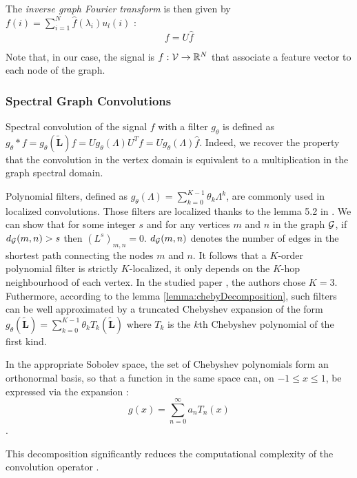 The \textit{inverse graph Fourier transform} is then given by $f(i) = \sum_{i=1}^{N} \hat{f}(\lambda_i)u_l(i)$ : 
\begin{equation}
    f = U\hat{f}
\end{equation}

Note that, in our case, the signal is $f:\mathcal{V}\rightarrow\mathbb{R}^N$ that associate a feature vector to each node of the graph.

\subsubsection{Spectral Graph Convolutions}

Spectral convolution of the signal $f$ with a filter $g_\theta$ is defined as $g_\theta * f = g_\theta(\widetilde{\mathbf{L}})f = Ug_\theta(\Lambda)U^Tf = U g_\theta(\Lambda)\hat{f}$. 
Indeed, we recover the property that the convolution in the vertex domain is equivalent to a multiplication in the graph spectral domain.

Polynomial filters, defined as $g_\theta(\Lambda) = \sum_{k=0}^{K-1}\theta_k\Lambda^k$, are commonly used in localized convolutions. Those filters are localized thanks to the lemma 5.2 in \cite{hammond_wavelets_2011}. We can show that for some integer $s$ and for any 
vertices $m$ and $n$ in the graph $\mathcal{G}$, if $d_{\mathcal{G}}(m, n) > s$ then $(L^s)_{m, n} = 0$. $d_{\mathcal{G}}(m, n)$ denotes the number of edges in the shortest path connecting the nodes $m$ and $n$.
It follows that a $K$-order polynomial filter is strictly $K$-localized, \ie it only depends on the $K$-hop neighbourhood of each vertex. In the studied paper \cite{Parisot17}, the authors chose $K=3$.\\ 
Futhermore, according to the lemma \ref{lemma:chebyDecomposition}, such filters can be well approximated by a truncated Chebyshev expansion of the form $g_\theta(\widetilde{\mathbf{L}}) = \sum_{k=0}^{K-1}\theta_kT_k(\widetilde{\mathbf{L}})$ where $T_k$ is the $k$th Chebyshev polynomial of the first kind.
\begin{lemma}\label{lemma:chebyDecomposition}
    In the appropriate Sobolev space, the set of Chebyshev polynomials form an orthonormal basis, so that a function in the same space can, on $-1\leq x \leq 1$, be expressed via the expansion : $$g(x) = \sum_{n=0}^{\infty} a_nT_n(x)$$.
\end{lemma}
This decomposition significantly reduces the computational complexity of the convolution operator \cite{Parisot17}.


